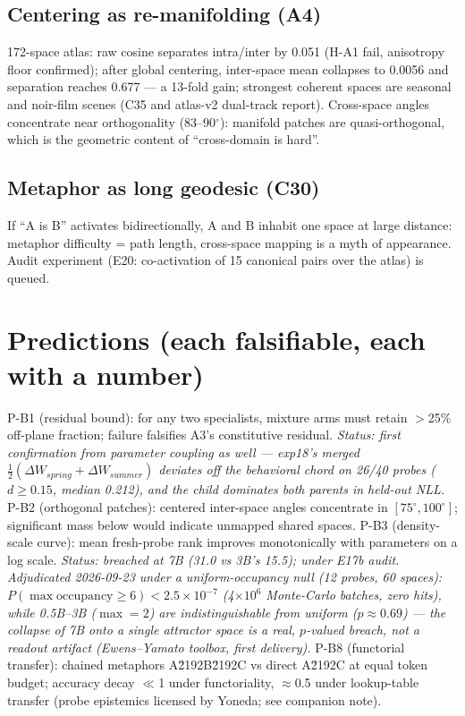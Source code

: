 \documentclass[11pt]{article}
\begin{document}
\subsection{Centering as re-manifolding (A4)}
172-space atlas: raw cosine separates intra/inter by 0.051 (H-A1 fail, anisotropy
floor confirmed); after global centering, inter-space mean collapses to 0.0056 and
separation reaches 0.677 --- a 13-fold gain; strongest coherent spaces are seasonal
and noir-film scenes (C35 and atlas-v2 dual-track report). Cross-space angles
concentrate near orthogonality (83--90$^\circ$): manifold patches are quasi-orthogonal,
which is the geometric content of ``cross-domain is hard''.

\subsection{Metaphor as long geodesic (C30)}
If ``A is B'' activates bidirectionally, A and B inhabit one space at large distance:
metaphor difficulty = path length, cross-space mapping is a myth of appearance.
Audit experiment (E20: co-activation of 15 canonical pairs over the atlas) is queued.

\section{Predictions (each falsifiable, each with a number)}
P-B1 (residual bound): for any two specialists, mixture arms must retain
$>$25\% off-plane fraction; failure falsifies A3's constitutive residual.
\emph{Status: first confirmation from parameter coupling as well --- exp18's merged
$\tfrac12(\Delta W_{spring}+\Delta W_{summer})$ deviates off the behavioral chord on
26/40 probes ($d\ge0.15$, median 0.212), and the child dominates both parents in
held-out NLL.}
P-B2 (orthogonal patches): centered inter-space angles concentrate in
$[75^\circ,100^\circ]$; significant mass below would indicate unmapped shared spaces.
P-B3 (density-scale curve): mean fresh-probe rank improves monotonically with parameters on a log scale. \emph{Status: breached at 7B (31.0 vs 3B's 15.5); under E17b audit. Adjudicated 2026-09-23 under a uniform-occupancy null (12 probes, 60 spaces): $P(\max\mathrm{occupancy}\ge 6)<2.5\times10^{-7}$ (4$\times10^{6}$ Monte-Carlo batches, zero hits), while 0.5B--3B ($\max=2$) are indistinguishable from uniform ($p\approx0.69$) --- the collapse of 7B onto a single attractor space is a real, $p$-valued breach, not a readout artifact (Ewens--Yamato toolbox, first delivery).}
P-B8 (functorial transfer): chained metaphors A\u2192B\u2192C vs direct A\u2192C at equal token budget; accuracy decay $\ll$1 under functoriality, $\approx$0.5 under lookup-table transfer (probe epistemics licensed by Yoneda; see companion note).
\end{document}
